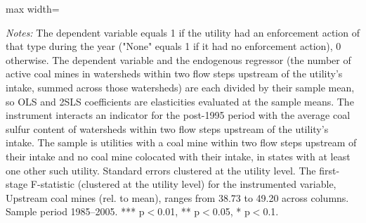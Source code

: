 \begin{table}[htbp]
{\begin{adjustbox}{max width=\linewidth}
\begin{tabular}
\bottomrule
\end{tabular}
\end{adjustbox}
}
\begin{minipage}{\linewidth}
\vspace{4pt}
\footnotesize
\raggedright
\textit{Notes:} The dependent variable equals 1 if the utility had an enforcement action of that type during the year ("None" equals 1 if it had no enforcement action), 0 otherwise. The dependent variable and the endogenous regressor (the number of active coal mines in watersheds within two flow steps upstream of the utility's intake, summed across those watersheds) are each divided by their sample mean, so OLS and 2SLS coefficients are elasticities evaluated at the sample means. The instrument interacts an indicator for the post-1995 period with the average coal sulfur content of watersheds within two flow steps upstream of the utility's intake. The sample is utilities with a coal mine within two flow steps upstream of their intake and no coal mine colocated with their intake, in states with at least one other such utility. Standard errors clustered at the utility level. The first-stage F-statistic (clustered at the utility level) for the instrumented variable, Upstream coal mines (rel. to mean), ranges from 38.73 to 49.20 across columns. Sample period 1985--2005. *** p$<$0.01, ** p$<$0.05, * p$<$0.1.
\end{minipage}
\end{table}

